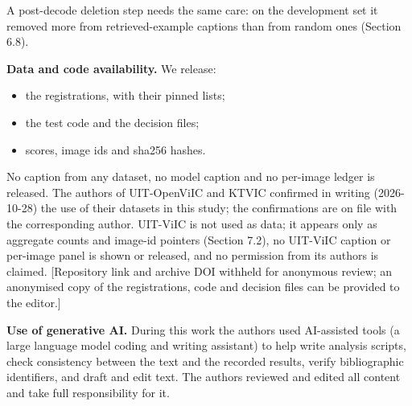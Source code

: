 \documentclass[manuscript,screen]{acmart}
\providecommand{\tightlist}{\setlength{\itemsep}{0pt}\setlength{\parskip}{0pt}}
\begin{document}
A post-decode deletion step needs the same care: on the development set it removed more from
retrieved-example captions than from random ones (Section 6.8).

\textbf{Data and code availability.} We release:

\begin{itemize}
\tightlist
\item
  the registrations, with their pinned lists;
\item
  the test code and the decision files;
\item
  scores, image ids and sha256 hashes.
\end{itemize}

No caption from any dataset, no model caption and no per-image ledger is released. The authors of
UIT-OpenViIC and KTVIC confirmed in writing (2026-10-28) the use of their datasets in this study;
the confirmations are on file with the corresponding author. UIT-ViIC is not used as data; it
appears only as aggregate counts and image-id pointers (Section 7.2), no UIT-ViIC caption or
per-image panel is shown or released, and no permission from its authors is claimed. {[}Repository
link and archive DOI withheld for anonymous review; an anonymised copy of the registrations, code
and decision files can be provided to the editor.{]}

\begin{acks}
\textbf{Use of generative AI.} During this work the authors used AI-assisted tools (a large language
model coding and writing assistant) to help write analysis scripts, check consistency between the
text and the recorded results, verify bibliographic identifiers, and draft and edit text. The
authors reviewed and edited all content and take full responsibility for it.
\end{acks}


\end{document}
